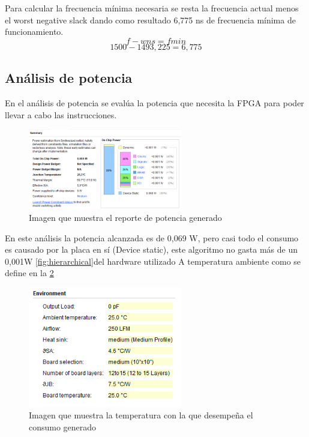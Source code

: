 	Para calcular la frecuencia mínima necesaria se resta la frecuencia actual menos el worst negative slack dando como resultado 6,775 ns de frecuencia mínima de funcionamiento.  
	\[f - wns = f{min}\]
	\[1500 - 1493,225 = 6,775\]

	

\subsection{Análisis de potencia}

	En el análisis de potencia se evalúa la potencia que necesita la FPGA para poder llevar a cabo las instrucciones.

	\begin{figure}[h!]
		\centering
		\includegraphics[width=0.6\textwidth]{./Images/img_res_experimentales/reportepower.png}
		\caption{Imagen que muestra el reporte de potencia generado}
		\label{fig:reportepotencia}
	\end{figure} 

	En este análisis la potencia alcanzada es de 0,069 W, pero casi todo el consumo es causado por la placa en sí (Device static), este algoritmo no gasta más de un 0,001W \cref*{fig:hierarchical}del hardware utilizado A temperatura ambiente como se define en la \cref*{fig:temperaturaambiente}

	\begin{figure}[h!]
		\centering
		\includegraphics[width=0.6\textwidth]{./Images/img_res_experimentales/temperaturaambientereportepower.png}
		\caption{Imagen que muestra la temperatura con la que desempeña el consumo generado}
		\label{fig:temperaturaambiente}
	\end{figure} 


